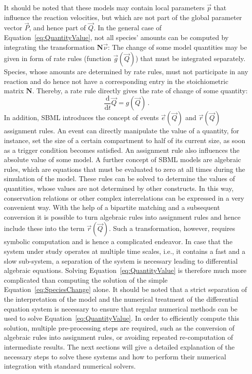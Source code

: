 \documentclass[10pt]{bmc_article}
\newenvironment{bmcformat}{\baselineskip20pt\sloppy\setboolean{publ}{false}}{\baselineskip20pt\sloppy}
\newcommand{\D}{\mathrm{d}}
\begin{document}
\begin{bmcformat}
It should be noted that these models may contain local parameters $\vec{p}$ that
influence the reaction velocities, but which are not part of the global parameter
vector $\vec{P}$, and hence part of $\vec{Q}$.
In the general case of Equation~\ref{eq:QuantityValue}, not all species' amounts
can be computed by integrating the transformation $\mathbf{N}\vec{\nu}$: The
change of some model quantities may be given in form of rate rules (function
$\vec{g}(\vec{Q})$) that must be integrated separately.
Species, whose amounts are determined by rate rules, must not participate in any
reaction and do hence not have a corresponding entry in the stoichiometric
matrix $\mathbf{N}$.
Thereby, a rate rule directly gives the rate of change of some quantity:
\begin{equation}
\frac{\D}{\D t}\vec{Q} = g(\vec{Q})\,.
\end{equation}
In addition, SBML introduces the concept of events $\vec{e}(\vec{Q})$ and
$\vec{r}(\vec{Q})$ assignment rules.
An event can directly manipulate the value of a quantity, for instance,
set the size of a certain compartment to half of its current size, as soon as a
trigger condition becomes satisfied.
An assignment rule also influences the absolute value of some model.
A further concept of SBML models are algebraic rules, which are equations that
must be evaluated to zero at all times during the simulation of the model.
These rules can be solved to determine the values of quantities, whose values
are not determined by other constructs.
In this way, conservation relations or other complex interrelations can be
expressed in a very convenient way.
With the help of a bipartite matching and a subsequent conversion it is possible
to turn algebraic rules into assignment rules and hence include these into the
term $\vec{r}(\vec{Q})$.
Such a transformation, however, requires symbolic computation and is
hence a complicated endeavor.
In case that the system under study operates at multiple time scales, i.e., it
contains a fast and a slow sub-system, a separation of the system is necessary
leading to differential algebraic equations.
Solving Equation~\ref{eq:QuantityValue} is therefore much more complicated than
computing the solution of the simple Equation~\ref{eq:SpeciesChange} alone.
It should be noted that a strict separation of the interpretation of the model
and the numerical treatment of the differential equation system is necessary to
ensure that regular numerical methods can be used to solve
Equation~\ref{eq:QuantityValue}.
In order to efficiently compute this solution, multiple pre-processing steps are
required, such as the conversion of algebraic rules into assignment rules, or
avoiding repeated re-computation of intermediate results.
The next sections will give a detailed explanation of the necessary steps to
solve these systems and how to perform their numerical integration with standard
numerical solvers.



\end{bmcformat}
\end{document}
